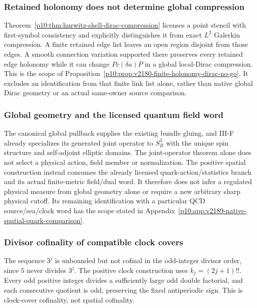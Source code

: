 \documentclass[12pt,a4paper]{article}
\begin{document}
\subsubsection{Retained holonomy does not determine global compression}
Theorem~\ref{p10:thm:hurwitz-shell-dirac-compression} licenses a
point stencil with first-symbol consistency and explicitly distinguishes
it from exact $L^2$ Galerkin compression. A finite retained edge list leaves
an open region disjoint from those edges. A smooth connection variation
supported there preserves every retained edge holonomy while it can change
$P c(\delta a)P$ in a global local-Dirac compression. This is the scope of
Proposition~\ref{p10:prop:v2180-finite-holonomy-dirac-no-go}.
It excludes an identification from that finite link list alone, rather
than native global Dirac geometry or an actual same-owner source comparison.


\subsubsection{Global geometry and the licensed quantum field word}
The canonical global pullback supplies the existing bundle gluing, and
III-F already specializes its generated joint operator to $S_R^3$ with
the unique spin structure and self-adjoint elliptic domains.
The joint-operator theorem alone does not select a physical action, field
member or normalization. The positive spatial construction instead consumes
the already licensed quark-action/statistics branch and its actual
finite-metric field/dual word. It therefore does not infer a regulated
physical measure from global geometry alone or require a new arbitrary
sharp physical cutoff. Its remaining identification with a particular QCD
source/sea/clock word has the scope stated in
Appendix~\ref{p10:app:v2189-native-spatial-quark-comparison}.


\subsubsection{Divisor cofinality of compatible clock covers}
The sequence $3^j$ is unbounded but not cofinal in the odd-integer divisor
order, since $5$ never divides $3^j$. The positive clock construction uses
$k_j=(2j+1)!!$. Every odd positive integer divides a sufficiently large
odd double factorial, and each consecutive quotient is odd, preserving
the fixed antiperiodic sign. This is clock-cover cofinality, not spatial
cofinality.
\end{document}
